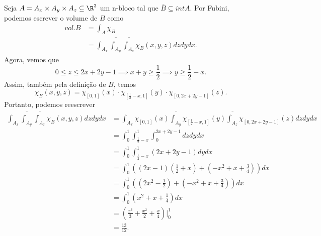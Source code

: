 \documentclass[a4paper]{report}
\begin{document}
Seja $A = A_x \times A_y\times A_z \subseteq\R^{3}$ um n-bloco tal que $\overline{B}\subseteq int A$. Por Fubini, podemos escrever o volume de $B$ como
\begin{align*}
    vol.B &= \int_A \chi_B \\
    &= \int_{A_x} \overline{\int_{A_y}} \overline{\int_{A_z}} \chi_B\left( x,y,z \right) dz dy dx 
.\end{align*}
Agora, vemos que \[
0\le z\le 2x + 2y -1 \implies x+y \ge \frac{1}{2} \implies y \ge \frac{1}{2} - x
.\] Assim, também pela definição de $B$, temos \[
\chi_B\left( x,y,z \right) = \chi_{\left[ 0,1 \right] }\left( x \right) \cdot \chi_{\left[ \frac{1}{2}-x, 1 \right] }\left( y \right) \cdot \chi_{\left[ 0, 2x+2y-1 \right] }\left( z \right) 
.\] Portanto, podemos reescrever 
\begin{align*}
    \int_{A_x} \overline{\int_{A_y}} \overline{\int_{A_z}} \chi_B\left( x,y,z \right) dz dy dx &= \int_{A_x}\chi_{\left[ 0,1 \right] }\left( x \right) \overline{\int_{A_y}} \chi_{\left[ \frac{1}{2}-x , 1\right] }\left( y \right)  \overline{\int_{A_z}} \chi_{\left[ 0, 2x+2y-1 \right] }\left( z \right)  dz dy dx \\
    &= \int_0^{1} \int_{\frac{1}{2}-x}^{1} \int_0^{2x+2y-1} dz dy dx \\
    &= \int_0^{1} \int_{\frac{1}{2}-x}^{1} \left( 2x + 2y -1 \right) dy dx  \\
    &= \int_0^{1} \left( \left( 2x-1 \right) \left( \frac{1}{2}+x \right) + \left( -x^2 + x + \frac{3}{4} \right) \right) dx \\
    &= \int_0^{1} \left( \left( 2x^2-\frac{1}{2} \right) + \left( -x^2 + x + \frac{3}{4} \right) \right) dx \\
    &= \int_0^{1} \left(  x^2 + x + \frac{1}{4} \right) dx \\
    &= \left( \frac{x^3}{3} + \frac{x^2}{2} + \frac{x}{4} \right)\Big|_0^{1}  \\
    &= \frac{13}{12}
.\end{align*}
\end{document}
